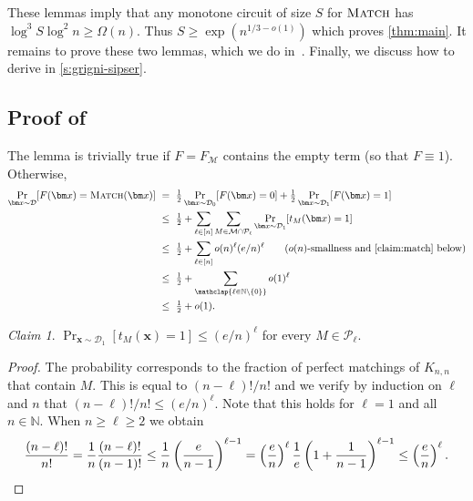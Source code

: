 \documentclass[11pt]{article}
\theoremstyle{plain}
\theoremstyle{definition}
\theoremstyle{remark}
\newtheorem{claim}{Claim}
\newcommand{\PM}{\textsc{Match}}
\def\cald{{\mathcal D}}
\def\calm{{\mathcal M}}
\def\calp{{\mathcal P}}
\begin{document}
These lemmas imply that any monotone circuit of size $S$ for $\PM$ has
$\log^3 S \log^2 n \geq {\Omega}(n)$. Thus $S\geq \exp(n^{1/3-o(1)})$ which proves \cref{thm:main}. It
remains to prove these two lemmas, which we do in~. Finally,
we discuss how to derive  in \cref{s:grigni-sipser}.


\subsection{Proof of \texorpdfstring{}{Lemma~\ref{lem:dnfs-are-dumb-intro}}}
\label{sec:proof-correlation}

The lemma is trivially true if $F=F_\calm$ contains the empty term (so that $F\equiv 1$). Otherwise,
\begin{align*}
    \Pr_{\bm x \sim \cald}[F(\bm x) = \PM(\bm x)]~
    & =~ {\textstyle\frac{1}{2}}\Pr_{\bm x \sim \cald_0}[F(\bm x) = 0]
     + {\textstyle\frac{1}{2}}\Pr_{\bm x \sim \cald_1}[F(\bm x) = 1]\\
    & \leq~ {\textstyle\frac{1}{2}} + 
    \sum_{\ell\in[n]}
    \sum_{M\in\calm\cap\calp_\ell}\Pr_{\bm x\sim\cald_1}[t_M(\bm x)=1] \\
    & \leq~ {\textstyle\frac{1}{2}} + \sum_{\ell\in[n]}
    o(n)^{\ell}(e/n)^\ell \tag{$o(n)$-smallness and \cref{claim:match} below}\\
    & \leq~ {\textstyle\frac{1}{2}} + \sum_{\mathclap{\ell\in\mathbb{N}\setminus\{0\}}}
    o(1)^{\ell} \\
    & \leq~ {\textstyle\frac{1}{2}}+o(1).
\end{align*}

\begin{claim}
    \label{claim:match}
    $\Pr_{\bm x\sim\cald_1}[t_M(\bm x)=1] \leq (e/n)^\ell$ for every $M \in \calp_\ell$.
\end{claim}
\begin{proof}
The probability corresponds to the fraction of perfect matchings of $K_{n,n}$ that contain $M$. This is equal to $(n-\ell)!/n!$ and we verify by induction on $\ell$ and $n$ that $(n-\ell)!/n! \leq (e/n)^\ell$.
    Note that this holds for $\ell = 1$ and all
    $n \in \mathbb{N}$.
    When $n \geq \ell \geq 2$ we obtain
    \begin{equation*}
        \frac{(n-\ell)!}{n!}
        =
        \frac{1}{n}
        \frac{(n-\ell)!}{(n-1)!}
        \leq
        \frac{1}{n}
        \left(
            \frac{e}{n-1}
        \right)^{\ell-1}
        =
        \left( \frac{e}{n} \right)^{\ell}
        \frac{1}{e}
        \left( 1 + \frac{1}{n-1} \right)^{\ell-1}
        \leq
        \left( \frac{e}{n} \right)^{\ell}.
        \qedhere
\end{equation*}
\end{proof}
\end{document}
